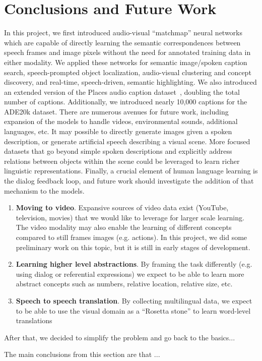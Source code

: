 \chapter{Conclusions and Future Work}

In this project, we first introduced audio-visual ``matchmap'' neural networks which are capable of directly learning the semantic correspondences between speech frames and image pixels without the need for annotated training data in either modality. We applied these networks for semantic image/spoken caption search, speech-prompted object localization, audio-visual clustering and concept discovery, and real-time, speech-driven, semantic highlighting. We also introduced an extended version of the Places audio caption dataset~\cite{harwath_nips}, doubling the total number of captions. Additionally, we introduced nearly 10,000 captions for the ADE20k dataset. There are numerous avenues for future work, including expansion of the models to handle videos, environmental sounds, additional languages, etc. It may possible to directly generate images given a spoken description, or generate artificial speech describing a visual scene. More focused datasets that go beyond simple spoken descriptions and explicitly address relations between objects within the scene could be leveraged to learn richer linguistic representations. Finally, a crucial element of human language learning is the dialog feedback loop, and future work should investigate the addition of that mechanism to the models.
\begin{enumerate}
    \item \textbf{Moving  to  video}.  Expansive sources  of  video  data  exist  (YouTube,  television, movies)  that  we  would  like  to  leverage  for  larger  scale  learning.  The  video  modality may  also  enable  the  learning  of  different  concepts  compared  to  still  frames  images (e.g.  actions). In this project, we did some preliminary work on this topic, but it is still in early stages of development.
    \item \textbf{Learning  higher  level  abstractions}.  By  framing  the  task  differently  (e.g. using  dialog  or  referential  expressions)  we  expect to  be  able  to  learn  more  abstract concepts  such  as  numbers,  relative  location,  relative  size,  etc.
    \item \textbf{Speech  to  speech translation}.  By  collecting  multilingual  data,  we  expect  to  be  able  to  use  the  visual domain  as  a  “Rosetta  stone”  to  learn  word-level  translations
\end{enumerate}

After that, we decided to simplify the problem and go back to the basics...

The main conclusions from this section are that ...